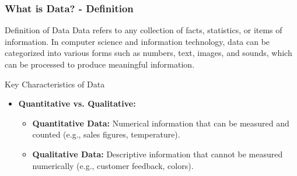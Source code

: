 \documentclass{beamer}
\begin{document}
\begin{frame}[fragile]
    \frametitle{What is Data? - Definition}
    \begin{block}{Definition of Data}
        Data refers to any collection of facts, statistics, or items of information. In computer science and information technology, data can be categorized into various forms such as numbers, text, images, and sounds, which can be processed to produce meaningful information.
    \end{block}
    
    \begin{block}{Key Characteristics of Data}
        \begin{itemize}
            \item \textbf{Quantitative vs. Qualitative:}
                \begin{itemize}
                    \item \textbf{Quantitative Data:} Numerical information that can be measured and counted (e.g., sales figures, temperature).
                    \item \textbf{Qualitative Data:} Descriptive information that cannot be measured numerically (e.g., customer feedback, colors).
                \end{itemize}
        \end{itemize}
    \end{block}
\end{frame}
\end{document}
